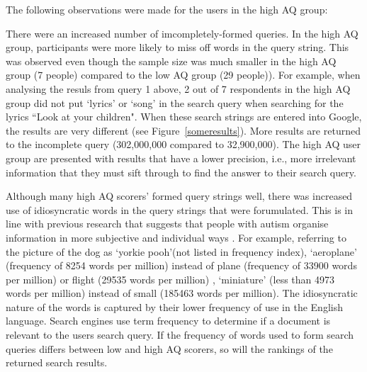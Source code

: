 \documentclass[a4paper, 11pt]{article}
\begin{document}
The following observations were made for the users in the high AQ group:
\begin{enumerate}
\item{There were an increased number of imcompletely-formed queries. In the high AQ group, participants were more likely to miss off words in the query string. This was observed even though the sample size was much smaller in the high AQ group (7 people) compared to the low AQ group (29 people)). For example, when analysing the resuls from query 1 above, 2 out of 7 respondents in the high AQ group did not put `lyrics' or `song' in the search query when searching for the lyrics ``Look at your children". When these search strings are entered into Google, the results are very different (see Figure~\ref{someresults}). More results are returned to the incomplete query (302,000,000 compared to 32,900,000). The high AQ user group are presented with results that have a lower precision, i.e., more irrelevant information that they must sift through to find the answer to their search query.\label{incomplete}


\item{Although many high AQ scorers' formed query strings well, there was increased use of idiosyncratic words in the query strings that were forumulated. This is in line with previous research that suggests that people with autism organise information in more subjective and individual ways \cite{subjective organisation}. For example, referring to the picture of the dog as `yorkie pooh'(not listed in frequency index), `aeroplane' (frequency of 8254 words per million) instead of plane (frequency of 33900 words per million) or flight (29535 words per million) , `miniature' (less than 4973 words per million) instead of small (185463 words per million). The idiosyncratic nature of the words is captured by their lower frequency of use in the English language. Search engines use term frequency to determine if a document is relevant to the users search query. If the frequency of words used to form search queries differs between low and high AQ scorers, so will the rankings of the returned search results.}
\label{idiosyncracy}

}
\end{enumerate}
\end{document}

